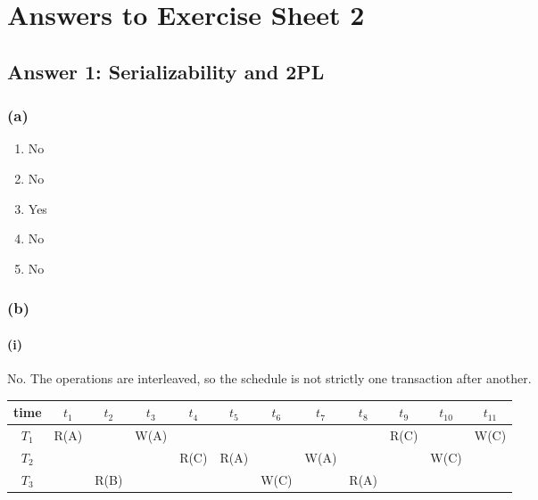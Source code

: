 \documentclass[11pt]{article}
\begin{document}

\section*{Answers to Exercise Sheet 2}

\subsection*{Answer 1: Serializability and 2PL}

\subsubsection*{(a)}
\begin{enumerate}
  \item No
  \item No
  \item Yes
  \item No
  \item No
\end{enumerate}

\subsubsection*{(b)}
\paragraph{(i)}
No. The operations are interleaved, so the schedule is not strictly one transaction after another.

\begin{center}
\begin{tabular}{|c|c|c|c|c|c|c|c|c|c|c|c|}
\hline
\textbf{time} & $t_1$ & $t_2$ & $t_3$ & $t_4$ & $t_5$ & $t_6$ & $t_7$ & $t_8$ & $t_9$ & $t_{10}$ & $t_{11}$ \\
\hline
$T_1$ & R(A) &       & W(A) &       &       &       &  &       & R(C) &       & W(C) \\
\hline
$T_2$ &      &       &      & R(C) & R(A) &       &  W(A)  &       &      & W(C) &       \\
\hline
$T_3$ &      & R(B) &      &       &      & W(C) &      & R(A) &      &      &       \\
\hline
\end{tabular}
\end{center}
\end{document}
